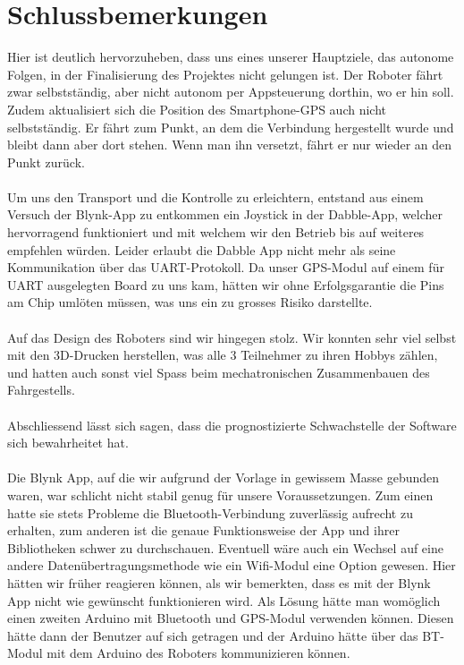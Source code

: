 \section{Schlussbemerkungen}

Hier ist deutlich hervorzuheben, dass uns eines unserer Hauptziele, das autonome Folgen, in der Finalisierung des Projektes nicht gelungen ist. Der Roboter fährt zwar selbstständig, aber nicht autonom per Appsteuerung dorthin, wo er hin soll. Zudem aktualisiert sich die Position des Smartphone-GPS auch nicht selbstständig. Er fährt zum Punkt, an dem die Verbindung hergestellt wurde und bleibt dann aber dort stehen. Wenn man ihn versetzt, fährt er nur wieder an den Punkt zurück.\\
\\
Um uns den Transport und die Kontrolle zu erleichtern, entstand aus einem Versuch der Blynk-App zu entkommen ein Joystick in der Dabble-App, welcher hervorragend funktioniert und mit welchem wir den Betrieb bis auf weiteres empfehlen würden. Leider erlaubt die Dabble App nicht mehr als seine Kommunikation über das UART-Protokoll. Da unser GPS-Modul auf einem für UART ausgelegten Board zu uns kam, hätten wir ohne Erfolgsgarantie die Pins am Chip umlöten müssen, was uns ein zu grosses Risiko darstellte.\\
\\
Auf das Design des Roboters sind wir hingegen stolz. Wir konnten sehr viel selbst mit den 3D-Drucken herstellen, was alle 3 Teilnehmer zu ihren Hobbys zählen, und hatten auch sonst viel Spass beim mechatronischen Zusammenbauen des Fahrgestells.\\ \\
Abschliessend lässt sich sagen, dass die prognostizierte Schwachstelle der Software sich bewahrheitet hat.\\
\\
Die Blynk App, auf die wir aufgrund der Vorlage in gewissem Masse gebunden waren, war schlicht nicht stabil genug für unsere Voraussetzungen. Zum einen hatte sie stets Probleme die Bluetooth-Verbindung zuverlässig aufrecht zu erhalten, zum anderen ist die genaue Funktionsweise der App und ihrer Bibliotheken schwer zu durchschauen. Eventuell wäre auch ein Wechsel auf eine andere Datenübertragungsmethode wie ein Wifi-Modul eine Option gewesen. Hier hätten wir früher reagieren können, als wir bemerkten, dass es mit der Blynk App nicht wie gewünscht funktionieren wird. Als Lösung hätte man womöglich einen zweiten Arduino mit Bluetooth und GPS-Modul verwenden können. Diesen hätte dann der Benutzer auf sich getragen und der Arduino hätte über das BT-Modul mit dem Arduino des Roboters kommunizieren können.\\
